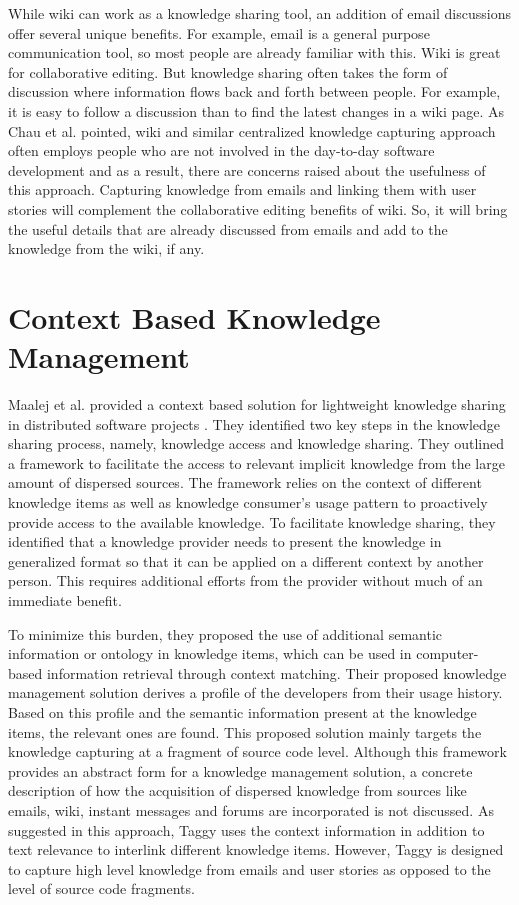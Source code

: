 While wiki can work as a knowledge sharing tool, an addition of email discussions offer several unique benefits. For example, email is a general purpose communication tool, so most people are already familiar with this. Wiki is great for collaborative editing. But knowledge sharing often takes the form of discussion where information flows back and forth between people. For example, it is easy to follow a discussion than to find the latest changes in a  wiki page. As Chau et al. pointed, wiki and similar centralized knowledge capturing approach often employs people who are not involved in the day-to-day software development and as a result, there are concerns raised about the usefulness of this approach\cite{a_case_study_of_wiki}. Capturing knowledge from emails and linking them with user stories will complement the collaborative editing benefits of wiki. So, it will bring the useful details that are already discussed from emails and add to the knowledge from the wiki, if any.

\section{Context Based Knowledge Management}
Maalej et al. provided a context based solution for lightweight knowledge sharing in distributed software projects \cite{a_lightweight}. They identified two key steps in the knowledge sharing process, namely, knowledge access and knowledge sharing. They outlined a framework to facilitate the access to relevant implicit knowledge from the large amount of dispersed sources. The framework relies on the context of different knowledge items as well as knowledge consumer's usage pattern to proactively provide access to the available knowledge. To facilitate knowledge sharing, they identified that a knowledge provider needs to present the knowledge in generalized format so that it can be applied on a different context by another person. This requires additional efforts from the provider without much of an immediate benefit.

To minimize this burden, they proposed the use of additional semantic information or ontology in knowledge items, which can be used in computer-based information retrieval through context matching. Their proposed knowledge management solution derives a profile of the developers from their usage history. Based on this profile and the semantic information present at the knowledge items, the relevant ones are found. This proposed solution mainly targets the knowledge capturing at a fragment of source code level. Although this framework provides an abstract form for a knowledge management solution, a concrete description of how the acquisition of dispersed knowledge from sources like emails, wiki, instant messages and forums are incorporated is not discussed. As suggested in this approach, Taggy uses the context information in addition to text relevance to interlink different knowledge items. However, Taggy is designed to capture high level knowledge from emails and user stories as opposed to the level of source code fragments.

